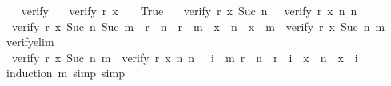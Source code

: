 \begin{isabellebody}
\ \ \isamarkupfalse%
\isanewline
{}\isamarkupfalse%
%
\endisatagproof
{\isafoldproof}%
%
\isadelimproof
\isanewline
%
\endisadelimproof
\isanewline
{}\isamarkupfalse%
\ verify\ \isanewline
\ \ {\isachardoublequoteopen}verify\ r\ x\ {}\ {\isacharunderscore}{\kern0pt}\ {\isacharequal}{\kern0pt}\ True{\isachardoublequoteclose}\ {\isacharbar}{\kern0pt}\isanewline
\ \ {\isachardoublequoteopen}verify\ r\ x\ {\isacharparenleft}{\kern0pt}Suc\ n{\isacharparenright}{\kern0pt}\ {}\ {\isacharequal}{\kern0pt}\ verify\ r\ x\ n\ n{\isachardoublequoteclose}\ {\isacharbar}{\kern0pt}\isanewline
\ \ {\isachardoublequoteopen}verify\ r\ x\ {\isacharparenleft}{\kern0pt}Suc\ n{\isacharparenright}{\kern0pt}\ {\isacharparenleft}{\kern0pt}Suc\ m{\isacharparenright}{\kern0pt}\ {\isacharequal}{\kern0pt}\ {\isacharparenleft}{\kern0pt}{\isacharparenleft}{\kern0pt}{\isacharparenleft}{\kern0pt}r\ {\isacharbang}{\kern0pt}\ n\ {\isacharequal}{\kern0pt}\ r\ {\isacharbang}{\kern0pt}\ m{\isacharparenright}{\kern0pt}\ {\isacharequal}{\kern0pt}\ {\isacharparenleft}{\kern0pt}x\ {\isacharbang}{\kern0pt}\ n\ {\isacharequal}{\kern0pt}\ x\ {\isacharbang}{\kern0pt}\ m{\isacharparenright}{\kern0pt}{\isacharparenright}{\kern0pt}\ {\isasymand}\ {\isacharparenleft}{\kern0pt}verify\ r\ x\ {\isacharparenleft}{\kern0pt}Suc\ n{\isacharparenright}{\kern0pt}\ m{\isacharparenright}{\kern0pt}{\isacharparenright}{\kern0pt}{\isachardoublequoteclose}\isanewline
\isanewline
{}\isamarkupfalse%
\ verify{\isacharunderscore}{\kern0pt}elim{\isacharunderscore}{\kern0pt}{}{\isacharcolon}{\kern0pt}\isanewline
\ \ {\isachardoublequoteopen}verify\ r\ x\ {\isacharparenleft}{\kern0pt}Suc\ n{\isacharparenright}{\kern0pt}\ m\ {\isacharequal}{\kern0pt}\ {\isacharparenleft}{\kern0pt}verify\ r\ x\ n\ n\ {\isasymand}\ \ {\isacharparenleft}{\kern0pt}{\isasymforall}i\ {\isacharless}{\kern0pt}\ m{\isachardot}{\kern0pt}\ {\isacharparenleft}{\kern0pt}r\ {\isacharbang}{\kern0pt}\ n\ {\isacharequal}{\kern0pt}\ r\ {\isacharbang}{\kern0pt}\ i{\isacharparenright}{\kern0pt}\ {\isacharequal}{\kern0pt}\ {\isacharparenleft}{\kern0pt}x\ {\isacharbang}{\kern0pt}\ n\ {\isacharequal}{\kern0pt}\ x\ {\isacharbang}{\kern0pt}\ i{\isacharparenright}{\kern0pt}{\isacharparenright}{\kern0pt}{\isacharparenright}{\kern0pt}{\isachardoublequoteclose}\isanewline
%
\isadelimproof
\ \ %
\endisadelimproof
%
\isatagproof
{}\isamarkupfalse%
\ {\isacharparenleft}{\kern0pt}induction\ m{\isacharcomma}{\kern0pt}\ simp{\isacharcomma}{\kern0pt}\ simp{\isacharparenright}{\kern0pt}\ \isanewline

\end{isabellebody}

